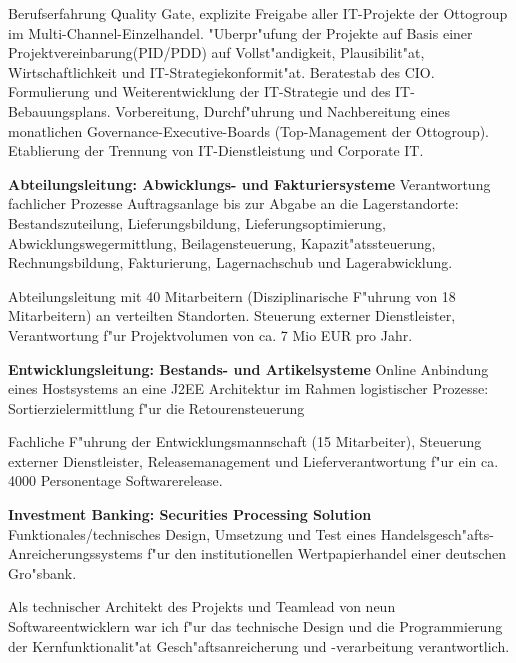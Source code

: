 \begin{rubric}{Berufserfahrung}
Quality Gate, explizite Freigabe aller IT-Projekte der Ottogroup im Multi-Channel-Einzelhandel. "Uberpr"ufung der Projekte auf Basis einer Projektvereinbarung(PID/PDD) auf Vollst"andigkeit, Plausibilit"at, Wirtschaftlichkeit und IT-Strategiekonformit"at. Beratestab des CIO. Formulierung und Weiterentwicklung der IT-Strategie und des IT-Bebauungsplans. Vorbereitung, Durchf"uhrung und Nachbereitung eines monatlichen Governance-Executive-Boards (Top-Management der Ottogroup). Etablierung der Trennung von IT-Dienstleistung und Corporate IT.

\entry*[08/2006 - 07/2009] \textbf{Abteilungsleitung: Abwicklungs- und Fakturiersysteme}\newline
{} 
Verantwortung fachlicher Prozesse Auftragsanlage bis zur Abgabe an die Lagerstandorte: Bestandszuteilung,
Lieferungsbildung, Lieferungsoptimierung, Abwicklungswegermittlung, Beilagensteuerung, Kapazit"atssteuerung, Rechnungsbildung, Fakturierung, Lagernachschub und Lagerabwicklung.\axelvspace

Abteilungsleitung mit 40 Mitarbeitern (Disziplinarische F"uhrung von 18 Mitarbeitern) an verteilten Standorten. Steuerung externer Dienstleister, Verantwortung f"ur Projektvolumen von ca. 7 Mio EUR pro Jahr.

\entry*[01/2005 - 07/2006] \textbf{Entwicklungsleitung: Bestands- und Artikelsysteme}\newline
{} 
Online Anbindung eines Hostsystems an eine J2EE Architektur im Rahmen logistischer Prozesse: Sortierzielermittlung f"ur die Retourensteuerung\axelvspace

Fachliche F"uhrung der Entwicklungsmannschaft (15 Mitarbeiter), Steuerung externer Dienstleister, Releasemanagement und Lieferverantwortung f"ur ein ca. 4000 Personentage Softwarerelease.

\entry*[10/2003 - 12/2004] \textbf{Investment Banking: Securities Processing Solution}\newline
{} 
Funktionales/technisches Design, Umsetzung und Test eines Handelsgesch"afts-Anreicherungssystems f"ur den institutionellen Wertpapierhandel einer deutschen Gro"sbank.\axelvspace

Als technischer Architekt des Projekts und Teamlead von neun Softwareentwicklern war ich f"ur das technische Design und die Programmierung der Kernfunktionalit"at Gesch"aftsanreicherung und -verarbeitung verantwortlich. 


\end{rubric}

